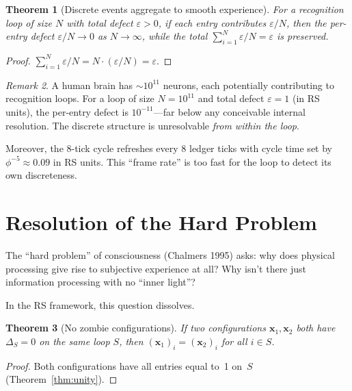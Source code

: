 \documentclass[11pt,a4paper]{article}
\theoremstyle{plain}
\newtheorem{theorem}{Theorem}[section]
\theoremstyle{definition}
\theoremstyle{remark}
\newtheorem{remark}[theorem]{Remark}
\begin{document}
\begin{theorem}[Discrete events aggregate to smooth experience]
\label{thm:smooth}
For a recognition loop of size $N$ with total defect $\varepsilon > 0$,
if each entry contributes $\varepsilon / N$, then the per-entry defect
$\varepsilon / N \to 0$ as $N \to \infty$, while the total
$\sum_{i=1}^N \varepsilon/N = \varepsilon$ is preserved.
\end{theorem}

\begin{proof}
$\sum_{i=1}^N \varepsilon/N = N \cdot (\varepsilon/N) = \varepsilon$.
\end{proof}

\begin{remark}
A human brain has $\sim\!10^{11}$ neurons, each potentially
contributing to recognition loops.  For a loop of size $N = 10^{11}$
and total defect $\varepsilon = 1$ (in RS units), the per-entry defect
is $10^{-11}$---far below any conceivable internal resolution.  The
discrete structure is unresolvable \emph{from within the loop}.

Moreover, the 8-tick cycle refreshes every 8 ledger ticks with cycle
time set by $\phi^{-5} \approx 0.09$ in RS units.  This ``frame rate''
is too fast for the loop to detect its own discreteness.
\end{remark}

\section{Resolution of the Hard Problem}
\label{sec:hard-problem}

The ``hard problem'' of consciousness (Chalmers 1995) asks: why does
physical processing give rise to subjective experience at all?  Why
isn't there just information processing with no ``inner light''?

In the RS framework, this question dissolves.

\begin{theorem}[No zombie configurations]
\label{thm:no-zombies}
If two configurations $\mathbf{x}_1, \mathbf{x}_2$ both have
$\Delta_S = 0$ on the same loop $S$, then
$(\mathbf{x}_1)_i = (\mathbf{x}_2)_i$ for all $i \in S$.
\end{theorem}

\begin{proof}
Both configurations have all entries equal to~1 on~$S$
(Theorem~\ref{thm:unity}).
\end{proof}
\end{document}
